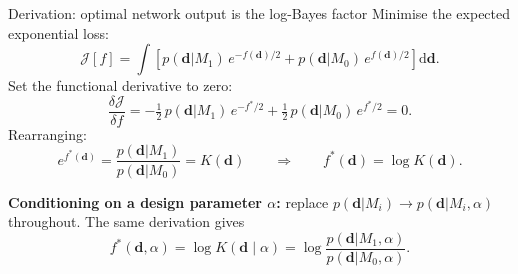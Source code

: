 \documentclass[aspectratio=169]{beamer}
\begin{document}
\begin{frame}{\small{Derivation: optimal network output is the log-Bayes factor}}
\footnotesize
Minimise the expected exponential loss:
\[
\mathcal{J}[f] = \int \left[ p(\mathbf{d}|M_1)\, e^{-f(\mathbf{d})/2} + p(\mathbf{d}|M_0)\, e^{f(\mathbf{d})/2} \right] \mathrm{d}\mathbf{d}.
\]
Set the functional derivative to zero:
\[
\frac{\delta \mathcal{J}}{\delta f} = -\tfrac{1}{2}\, p(\mathbf{d}|M_1)\, e^{-f^*/2} + \tfrac{1}{2}\, p(\mathbf{d}|M_0)\, e^{f^*/2} = 0.
\]
Rearranging:
\[
e^{f^*(\mathbf{d})} = \frac{p(\mathbf{d}|M_1)}{p(\mathbf{d}|M_0)} = K(\mathbf{d})
\qquad \Longrightarrow \qquad
\boxed{f^*(\mathbf{d}) = \log K(\mathbf{d})}.
\]

\vspace{0.08cm}
\textbf{Conditioning on a design parameter $\alpha$:} replace $p(\mathbf{d}|M_i) \to p(\mathbf{d}|M_i, \alpha)$ throughout. The same derivation gives
\[
\boxed{f^*(\mathbf{d}, \alpha) = \log K(\mathbf{d} \mid \alpha)
= \log \frac{p(\mathbf{d}|M_1,\alpha)}{p(\mathbf{d}|M_0,\alpha)}}.
\]
\end{frame}
\end{document}
